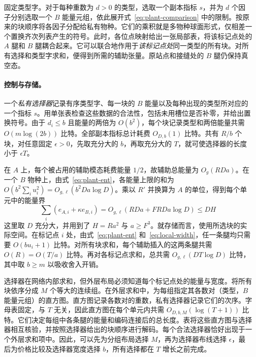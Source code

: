 固定类型字。对于每种重数为 $d>0$ 的类型，选取一个副本指标 $s$，并为 $d$ 个因子分别选取一个 $B$ 能量元组，依此展开式~\eqref{eq:plant-comparison} 中的限制。按原来的块顺序将各因子分配给私有物种。它们的乘积就是多物种球面形式，仅相差一个置换齐次列表产生的符号。此时，各位点映射给出一张局部表，将该标记点处的 $A$ 腿和 $B$ 腿耦合起来。它可以联合地作用于\emph{该标记点处}同一类型的所有块。对所有选择和类型字求和，便得到所需的辅助张量。原站点和接缝处的 $B$ 腿仍保持真空态。

\paragraph{控制与存储。}一个\emph{私有选择器}记录有序类型字、每一块的 $B$ 能量以及每种出现的类型所对应的一个指标 $s$。用单张表检查这些数据的合法性，包括未用槽位是否补零，并给出置换符号。由于 $d_i\le b$ 且能量的两倍为 $O(b^2)$，每个块记录类型和两倍能量共需 $O(m\log(2b))$ 比特。全部副本指标总计耗费 $O_{D,b}(1)$ 比特。共有 $R/b$ 个块，对任意固定 $\epsilon>0$，先取充分大的 $b$，再取充分大的 $T$，就可使选择器的长度小于 $\epsilon T$。

在 $A$ 上，每个被占用的辅助模态耗费能量 $1/2$，故辅助总能量为 $O_g(RDa)$。在一个 $B$ 物种上，由式~\eqref{eq:plant-ent}，各能量上限的和为 $O(b^2\sum_i u_i^2)=O_{g,\ell}(b^2 Da\log D)$。乘以 $R'$ 并换算为 $A$ 的单位，得到每个单元中的能量界 \[
 \sum_i(e_{A,i}+\kappa e_{B,i})
    =O_{g,\ell}(RDa+F RDa\log D)\le D H
\] 这里取 $D$ 充分大，并用到了 $H=Ra^2$ 与 $a\ge F^3$。就存储而言，使用所选块的实际空间。在标记点 $i$ 处，由式~\eqref{eq:plant-ent} 和~\eqref{eq:local-width}，任一条腿均只需要 $O(bu_i+1)$ 比特。对所有块求和，每个辅助插入的这两条腿共需 $O(R)=O(T/a)$ 比特。再对各标记点求和，总共需 $O_{g,\ell}(DT\log D)$ 比特，其中取 $b\ge m$ 以吸收舍入开销。

选择器在网络内部求和，但外层布局必须知道每个标记点处的能量与宽度。将所有块依序分成 $M$ 个等大的连续组。在外层求和中，为每组指定其各数对（类型，$B$ 能量元组）的直方图。直方图记录各数对的重数，私有选择器记录它们的次序。字母表固定，与 $T$ 无关，因此直方图在每个单元内共需 $O_{D,b,M}(\log(T+1))$ 比特。它们决定每组中各条腿的能量和编码连接后的总长度。表将这些直方图与选择器相互核验，并按照选择器给出的块顺序进行解码。每个合法选择器恰好出现于一个外层求和项中。因此，可以先为分组布局选择 $M$，再为选择器布线选择 $\epsilon$，最后为价格比较及选择器宽度选择 $b$，所有选择都在 $T$ 增长之前完成。
